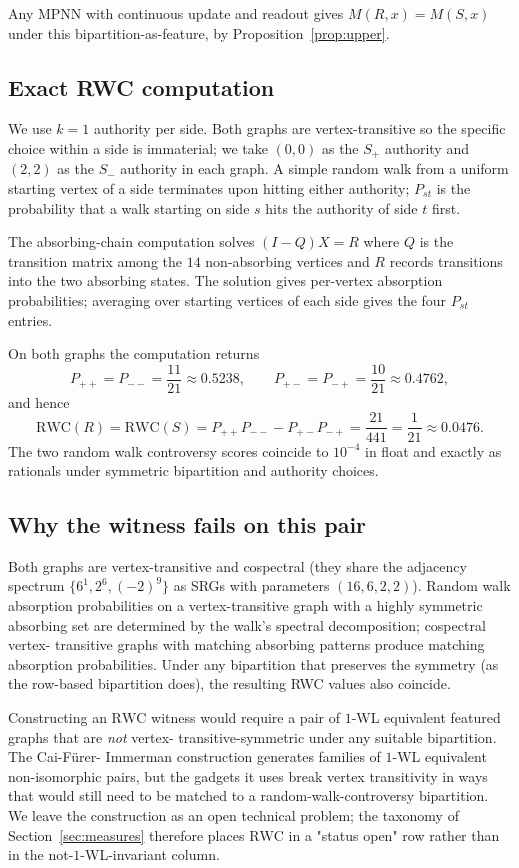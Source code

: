 Any MPNN with continuous update and readout gives $M(R, x) = M(S,
x)$ under this bipartition-as-feature, by Proposition~\ref{prop:upper}.

\subsection{Exact RWC computation}

We use $k = 1$ authority per side. Both graphs are vertex-transitive
so the specific choice within a side is immaterial; we take $(0, 0)$
as the $S_+$ authority and $(2, 2)$ as the $S_-$ authority in each
graph. A simple random walk from a uniform starting vertex of a
side terminates upon hitting either authority; $P_{st}$ is the
probability that a walk starting on side $s$ hits the authority of
side $t$ first.

The absorbing-chain computation solves $(I - Q) X = R$ where $Q$ is
the transition matrix among the $14$ non-absorbing vertices and $R$
records transitions into the two absorbing states. The solution
gives per-vertex absorption probabilities; averaging over starting
vertices of each side gives the four $P_{st}$ entries.

On both graphs the computation returns
\[
P_{++} = P_{--} = \frac{11}{21} \approx 0.5238,
\qquad
P_{+-} = P_{-+} = \frac{10}{21} \approx 0.4762,
\]
and hence
\[
\mathrm{RWC}(R) = \mathrm{RWC}(S) = P_{++} P_{--} - P_{+-} P_{-+} =
\frac{21}{441} = \frac{1}{21} \approx 0.0476.
\]
The two random walk controversy scores coincide to $10^{-4}$ in
float and exactly as rationals under symmetric bipartition and
authority choices.

\subsection{Why the witness fails on this pair}

Both graphs are vertex-transitive and cospectral (they share the
adjacency spectrum $\{6^1, 2^6, (-2)^9\}$ as SRGs with parameters
$(16, 6, 2, 2)$). Random walk absorption probabilities on a
vertex-transitive graph with a highly symmetric absorbing set are
determined by the walk's spectral decomposition; cospectral vertex-
transitive graphs with matching absorbing patterns produce matching
absorption probabilities. Under any bipartition that preserves the
symmetry (as the row-based bipartition does), the resulting RWC
values also coincide.

Constructing an $\mathrm{RWC}$ witness would require a pair of
$1$-WL equivalent featured graphs that are \emph{not} vertex-
transitive-symmetric under any suitable bipartition. The Cai-Fürer-
Immerman construction \citep{CFI1992} generates families of
$1$-WL equivalent non-isomorphic pairs, but the gadgets it uses
break vertex transitivity in ways that would still need to be
matched to a random-walk-controversy bipartition. We leave the
construction as an open technical problem; the taxonomy of
Section~\ref{sec:measures} therefore places $\mathrm{RWC}$ in a
"status open" row rather than in the not-$1$-WL-invariant column.
